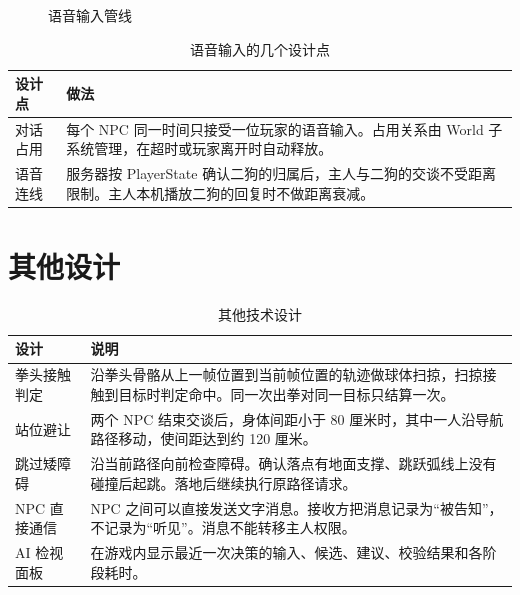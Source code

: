 \documentclass[11pt]{article}
\begin{document}
\begin{figure}[H]
\centering
{}
\caption{语音输入管线}
\end{figure}

\begin{table}[H]
\small
\begin{tabularx}{\textwidth}{@{}l L@{}}
\toprule
\textbf{设计点} & \textbf{做法} \\
\midrule
对话占用 & 每个 NPC 同一时间只接受一位玩家的语音输入。占用关系由 World 子系统管理，在超时或玩家离开时自动释放。 \\
语音连线 & 服务器按 PlayerState 确认二狗的归属后，主人与二狗的交谈不受距离限制。主人本机播放二狗的回复时不做距离衰减。 \\
\bottomrule
\end{tabularx}
\caption{语音输入的几个设计点}
\end{table}

\section{其他设计}

\begin{table}[H]
\small
\begin{tabularx}{\textwidth}{@{}l L@{}}
\toprule
\textbf{设计} & \textbf{说明} \\
\midrule
拳头接触判定 & 沿拳头骨骼从上一帧位置到当前帧位置的轨迹做球体扫掠，扫掠接触到目标时判定命中。同一次出拳对同一目标只结算一次。 \\
站位避让 & 两个 NPC 结束交谈后，身体间距小于 80 厘米时，其中一人沿导航路径移动，使间距达到约 120 厘米。 \\
跳过矮障碍 & 沿当前路径向前检查障碍。确认落点有地面支撑、跳跃弧线上没有碰撞后起跳。落地后继续执行原路径请求。 \\
NPC 直接通信 & NPC 之间可以直接发送文字消息。接收方把消息记录为“被告知”，不记录为“听见”。消息不能转移主人权限。 \\
AI 检视面板 & 在游戏内显示最近一次决策的输入、候选、建议、校验结果和各阶段耗时。 \\
\bottomrule
\end{tabularx}
\caption{其他技术设计}
\end{table}
\end{document}
